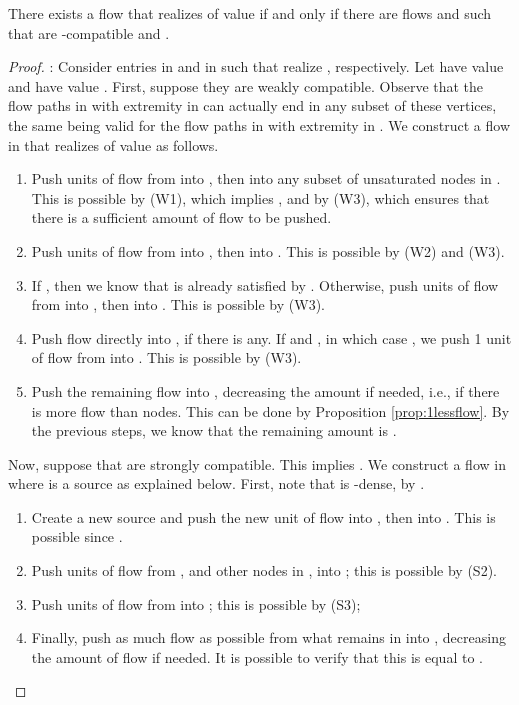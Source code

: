\documentclass{llncs}
\begin{document}
\begin{lemma}
There exists a flow  that realizes  of value  if and only if there are flows  and  such that  are -compatible and .
\end{lemma}
\begin{proof}
: Consider entries  in  and  in  such that  realize , respectively. Let  have value  and  have value . First, suppose they are weakly compatible. Observe that the flow paths in  with extremity in  can actually end in any subset of these vertices, the same being valid for the flow paths in  with extremity in . We construct a flow in  that realizes  of value  as follows. 
\begin{enumerate}
  \item Push  units of flow from  into , then into any subset of  unsaturated nodes in . This is possible by (W1), which implies , and by (W3), which ensures that there is a sufficient amount of flow to be pushed.
  \item Push  units of flow from  into , then into . This is possible by (W2) and (W3).
  \item If , then we know that  is already satisfied by . Otherwise, push  units of flow from  into , then into . This is possible by (W3).
  \item Push flow  directly into , if there is any. If  and , in which case , we push 1 unit of flow from  into . This is possible by (W3).
  \item Push the remaining flow into , decreasing the amount if needed, i.e., if there is more flow than nodes. This can be done by Proposition \ref{prop:1lessflow}. By the previous steps, we know that the remaining amount is . 
\end{enumerate}

Now, suppose that  are strongly compatible. This implies . We construct a flow in  where  is a source as explained below. First, note that  is -dense, by .

\begin{enumerate}
  \item Create a new source  and push the new unit of flow into , then into . This is possible since .
  \item Push  units of flow from , and  other nodes in , into ; this is possible by (S2).
  \item Push  units of flow from  into ; this is possible by (S3);
  \item Finally, push as much flow as possible from what remains in  into , decreasing the amount of flow if needed. It is possible to verify that this is equal to .
\end{enumerate}


\end{proof}
\end{document}
